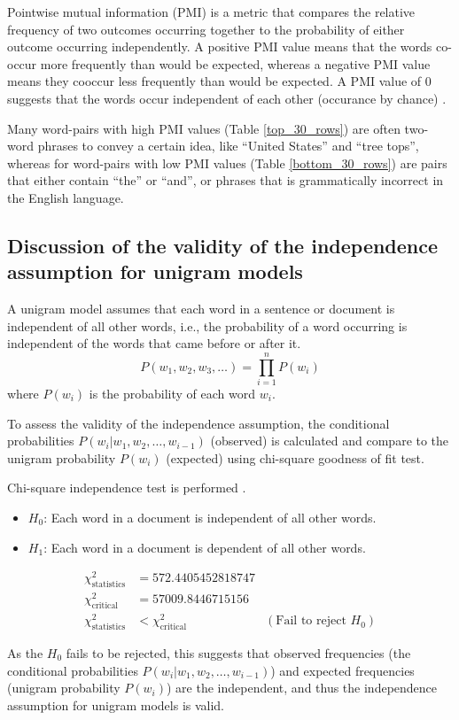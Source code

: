 Pointwise mutual information (PMI) is a metric that compares the relative frequency of two outcomes occurring together to the probability of either outcome occurring independently.
A positive PMI value means that the words co-occur more frequently than would be expected, whereas a negative PMI value means they cooccur less frequently than would be expected.
A PMI value of 0 suggests that the words occur independent of each other (occurance by chance) \cite{web:pmi}. 

Many word-pairs with high PMI values (Table \ref{top_30_rows}) are often two-word phrases to convey a certain idea, like ``United States'' and ``tree tops'', 
whereas for word-pairs with low PMI values (Table \ref{bottom_30_rows}) are pairs that either contain ``the'' or ``and'', or phrases that is grammatically incorrect in the English language. 


\subsection*{Discussion of the validity of the independence assumption for unigram models}

A unigram model assumes that each word in a sentence or document is independent of all other words, 
i.e., the probability of a word occurring is independent of the words that came before or after it.
$$P(w_1, w_2, w_3, \dots) = \prod^{n}_{i=1} P(w_i)$$
where $P(w_i)$ is the probability of each word $w_i$.

To assess the validity of the independence assumption, 
the conditional probabilities $P(w_i | w_1, w_2, \dots, w_{i-1})$ (observed) is calculated
and compare to the unigram probability $P(w_i)$ (expected)
using chi-square goodness of fit test.

Chi-square independence test is performed \cite{web:chi_sq_test}.
\begin{itemize}
    \item $H_0$: Each word in a document is independent of all other words.
    \item $H_1$: Each word in a document is dependent of all other words.
\end{itemize}

\begin{align*}
    \chi^2_{\text{statistics}} & = 572.4405452818747 \\
    \chi^2_{\text{critical}} & = 57009.8446715156 \\
    \chi^2_{\text{statistics}} & < \chi^2_{\text{critical}} & (\text{Fail to reject } H_0)
\end{align*}

As the $H_0$ fails to be rejected, this suggests that observed frequencies (the conditional probabilities $P(w_i | w_1, w_2, \dots, w_{i-1})$) and expected frequencies (unigram probability $P(w_i)$) are the independent, and thus the independence assumption for unigram models is valid.